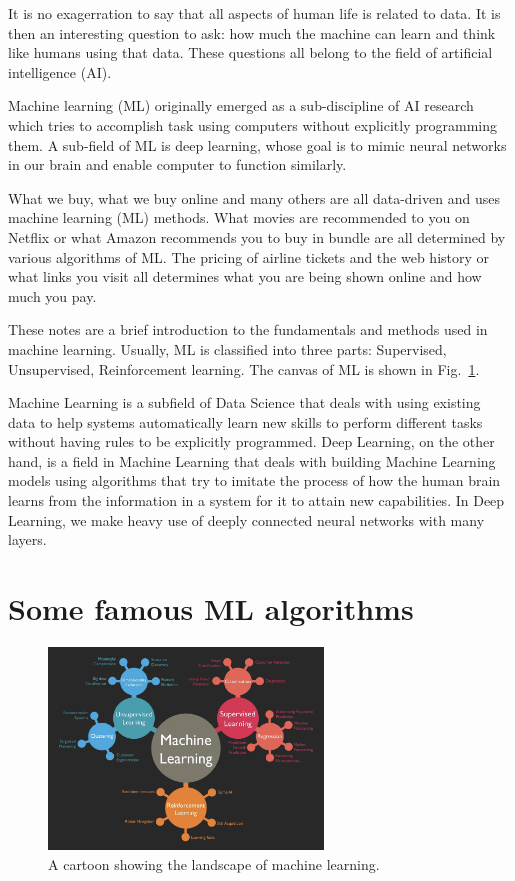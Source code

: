 \documentclass[11pt]{article}
\begin{document}
	
	
	It is no exagerration to say that all aspects of human life is related to data. 
	It is then an interesting question to ask: how much the machine can learn and think 
	like humans using that data. These questions all belong to the field of artificial intelligence (AI). 
	
	
	Machine learning (ML) originally emerged as a sub-discipline of AI research which tries to accomplish task 
	using computers without explicitly programming them. A sub-field of ML is deep learning, whose goal is to mimic
	neural networks in our brain and enable computer to function similarly. 
	
	
	What we buy, what we buy online and many others
	are all data-driven and uses machine learning (ML) methods. What movies are recommended to you on Netflix or what Amazon
	recommends you to buy in bundle are all determined by various algorithms of ML. The pricing of airline tickets and the web history 
	or what links you visit all determines what you are being shown online and how much you pay. 
	
	These notes are a brief introduction to the fundamentals and methods used in machine learning. Usually, ML is 
	classified into three parts: Supervised, Unsupervised, Reinforcement learning. The canvas of ML is shown in Fig.~\ref{fig:EXP}. 
	
	
	Machine Learning is a subfield of Data Science that deals with using existing data to help systems automatically learn new skills to perform different 	tasks without having rules to be explicitly programmed. Deep Learning, on the other hand, is a field in Machine Learning that deals with building Machine 	Learning models using algorithms that try to imitate the process of how the human brain learns from the information in a system for it to attain new 		capabilities. In Deep Learning, we make heavy use of deeply connected neural networks with many layers.
	
	
	
	
	\newpage
	\section{Some famous ML algorithms}
	
	
	

\begin{figure}
\centering 
\includegraphics[width=0.65\textwidth]{cartoonML.png}
\caption{\label{fig:EXP}A cartoon showing the landscape of machine learning.}
\end{figure}
	
\end{document}
